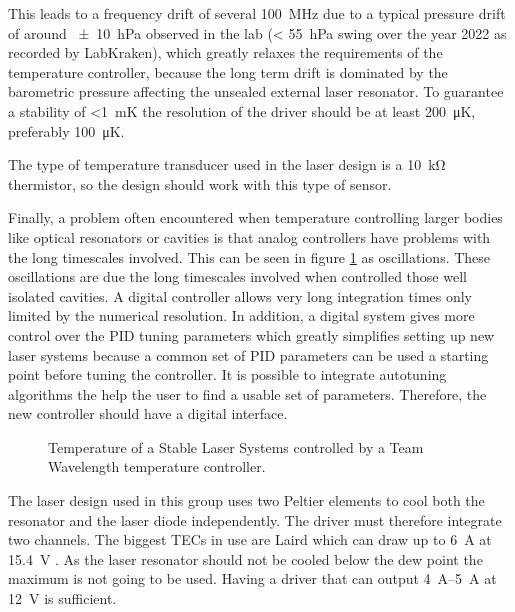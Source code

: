 This leads to a frequency drift of several \qty{100}{\MHz} due to a typical pressure drift of around \qty{\pm 10}{\hecto \Pa} observed in the lab (\qty{< 55}{\hecto \Pa} swing over the year 2022 as recorded by LabKraken), which greatly relaxes the requirements of the temperature controller, because the long term drift is dominated by the barometric pressure affecting the unsealed external laser resonator. To guarantee a stability of \qty{<1}{\milli \K} the resolution of the driver should be at least \qty{200}{\micro \K}, preferably \qty{100}{\micro \K}.

The type of temperature transducer used in the laser design is a \qty{10}{\kilo \ohm} thermistor, so the design should work with this type of sensor.

Finally, a problem often encountered when temperature controlling larger bodies like optical resonators or cavities is that analog controllers have problems with the long timescales involved. This can be seen in figure \ref{fig:stability_cavity} as oscillations. These oscillations are due the long timescales involved when controlled those well isolated cavities. A digital controller allows very long integration times only limited by the numerical resolution. In addition, a digital system gives more control over the PID tuning parameters which greatly simplifies setting up new laser systems because a common set of PID parameters can be used a starting point before tuning the controller. It is possible to integrate autotuning algorithms the help the user to find a usable set of parameters. Therefore, the new controller should have a digital interface.

\begin{figure}[ht]
    \centering
    
    \caption{Temperature of a Stable Laser Systems  controlled by a Team Wavelength  temperature controller.}
    \label{fig:stability_cavity}
\end{figure}

The laser design used in this group uses two Peltier elements to cool both the resonator and the laser diode independently. The driver must therefore integrate two channels. The biggest TECs in use are Laird  which can draw up to \qty{6}{\A} at \qty{15.4}{\V} \cite{datasheet_tec}. As the laser resonator should not be cooled below the dew point the maximum is not going to be used. Having a driver that can output \qtyrange{4}{5}{\A} at \qty{12}{\V} is sufficient.

